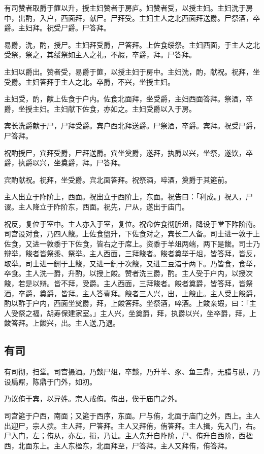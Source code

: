 \documentclass[]{article}
\begin{document}
有司赞者取爵于篚以升，授主妇赞者于房庐。妇赞者受，以授主妇。主妇洗于房中，出酌，入户，西面拜，献尸。尸拜受。主妇主人之北西面拜送爵。尸祭酒，卒爵。主妇拜。祝受尸爵。尸答拜。

易爵，洗，酌，授尸。主妇拜受爵，尸答拜。上佐食绥祭。主妇西面，于主人之北受祭，祭之，其绥祭如主人之礼，不嘏，卒爵，拜。尸答拜。

主妇以爵出。赞者受，易爵于篚，以授主妇于房中。主妇洗，酌，献祝。祝拜，坐受爵。主妇答拜于主人之北。卒爵，不兴，坐授主妇。

主妇受，酌，献上佐食于户内。佐食北面拜，坐受爵，主妇西面答拜。祭酒，卒爵，坐授主妇。主妇献下佐食，亦如之。主妇受爵以入于房。

宾长洗爵献于尸，尸拜受爵。宾户西北拜送爵。尸祭酒，卒爵。宾拜。祝受尸爵，尸答拜。

祝酌授尸，宾拜受爵，尸拜送爵。宾坐奠爵，遂拜，执爵以兴，坐祭，遂饮，卒爵，执爵以兴，坐奠爵，拜。尸答拜。

宾酌献祝。祝拜，坐受爵。宾北面答拜。祝祭酒，啐酒，奠爵于其筵前。

主人出立于阼阶上，西面。祝出立于西阶上，东面。祝告曰：「利成。」祝入，尸谡。主人降立于阼阶东，西面。祝先，尸从，遂出于庙门。

祝反，复位于室中。主人亦入于室，复位。祝命佐食彻肵俎，降设于堂下阼阶南。司宫设对食，乃四人餕。上佐食盥升，下佐食对之，宾长二人备。司士进一敦于上佐食，又进一敦黍于下佐食，皆右之于席上。资黍于羊俎两端，两下是餕。司士乃辩举，餕者皆祭黍、祭举。主人西面，三拜餕者。餕者奠举于俎，皆答拜，皆反，取举。司士进一鉶于上餕，又进一鉶于次餕，又进二豆湆于两下。乃皆食，食举，卒食。主人洗一爵，升酌，以授上餕。赞者洗三爵，酌。主人受于户内，以授次餕，若是以辩。皆不拜，受爵。主人西面，三拜餕者。餕者奠爵，皆答拜，皆祭酒，卒爵，奠爵，皆拜。主人答壹拜。餕者三人兴，出，上餕止。主人受上餕爵，酌以酢于户内，西面坐奠爵，拜，上餕答拜。坐祭酒，啐酒。上餕亲嘏，曰：「主人受祭之福，胡寿保建家室。」主人兴，坐奠爵，拜，执爵以兴，坐卒爵，拜，上餕答拜。上餕兴，出。主人送,乃退。

\hypertarget{header-n76}{%
\subsection{有司}\label{header-n76}}

有司彻，扫堂。司宫摄酒。乃燅尸俎，卒燅，乃升羊、豕、鱼三鼎，无腊与肤，乃设扃鼏，陈鼎于门外，如初。

乃议侑于宾，以异姓。宗人戒侑。侑出，俟于庙门之外。

司宫筵于户西，南面；又筵于西序，东面。尸与侑，北面于庙门之外，西上。主人出迎尸，宗人摈。主人拜，尸答拜。主人又拜侑，侑答拜。主人揖，先入门，右。尸入门，左；侑从，亦左。揖，乃让。主人先升自阼阶，尸、侑升自西阶，西楹西，北面东上。主人东楹东，北面拜至，尸答拜。主人又拜侑，侑答拜。
\end{document}
